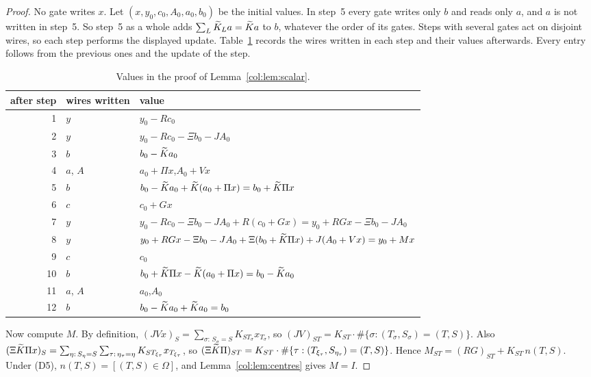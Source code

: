 \begin{proof}
No gate writes $x$. Let $(x,y_0,c_0,A_0,a_0,b_0)$ be the initial values. In step~5 every gate writes
only $b$ and reads only $a$, and $a$ is not written in step~5. So step~5 as a whole adds
$\sum_L\widetilde K_La=\widetilde K a$ to $b$, whatever the order of its gates. Steps with several gates act on
disjoint wires, so each step performs the displayed update. Table~\ref{col:tab:trace} records the
wires written in each step and their values afterwards. Every entry follows from the previous ones and
the update of the step.

\begin{table}[ht]\centering\small
\begin{tabular}{@{}r l l@{}}
\toprule
after step & wires written & value\\
\midrule
1 & $y$ & $y_0-Rc_0$\\
2 & $y$ & $y_0-Rc_0-\Xi b_0-JA_0$\\
3 & $b$ & $b_0-\widetilde K a_0$\\
4 & $a$, $A$ & $a_0+\Pi x$,\quad $A_0+Vx$\\
5 & $b$ & $b_0-\widetilde K a_0+\widetilde K(a_0+\Pi x)=b_0+\widetilde K\Pi x$\\
6 & $c$ & $c_0+Gx$\\
7 & $y$ & $y_0-Rc_0-\Xi b_0-JA_0+R(c_0+Gx)=y_0+RGx-\Xi b_0-JA_0$\\
8 & $y$ & $y_0+RGx-\Xi b_0-JA_0+\Xi(b_0+\widetilde K\Pi x)+J(A_0+Vx)=y_0+Mx$\\
9 & $c$ & $c_0$\\
10 & $b$ & $b_0+\widetilde K\Pi x-\widetilde K(a_0+\Pi x)=b_0-\widetilde K a_0$\\
11 & $a$, $A$ & $a_0$,\quad $A_0$\\
12 & $b$ & $b_0-\widetilde K a_0+\widetilde K a_0=b_0$\\
\bottomrule
\end{tabular}
\caption{Values in the proof of Lemma~\ref{col:lem:scalar}.}\label{col:tab:trace}
\end{table}

Now compute $M$. By definition,
$(JVx)_S=\sum_{\sigma:\,S_\sigma=S}K_{ST_\sigma}x_{T_\sigma}$, so
$(JV)_{ST}=K_{ST}\cdot\#\{\sigma:(T_\sigma,S_\sigma)=(T,S)\}$. Also
$(\Xi\widetilde K\Pi x)_S=\sum_{\eta:\,S_\eta=S}\sum_{\tau:\,\eta_\tau=\eta}K_{ST_{\xi_\tau}}x_{T_{\xi_\tau}}$, so
$(\Xi\widetilde K\Pi)_{ST}=K_{ST}\cdot\#\{\tau:(T_{\xi_\tau},S_{\eta_\tau})=(T,S)\}$. Hence
$M_{ST}=(RG)_{ST}+K_{ST}\,n(T,S)$. Under (D5), $n(T,S)=[(T,S)\in\Omega]$, and
Lemma~\ref{col:lem:centres} gives $M=I$.
\end{proof}

